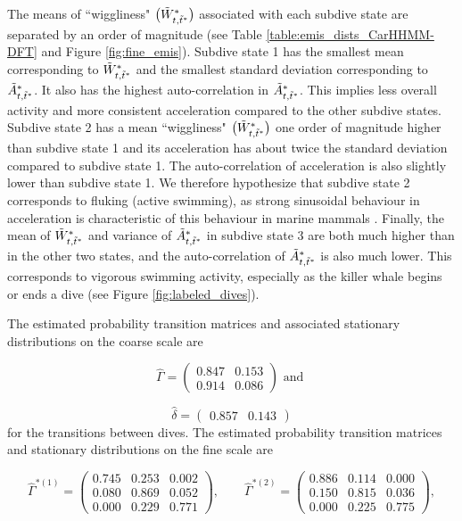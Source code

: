 The means of ``wiggliness" $\big(\tilde{W}^*_{t,\tilde t^*}\big)$ associated with each subdive state are separated by an order of magnitude (see Table \ref{table:emis_dists_CarHHMM-DFT} and Figure \ref{fig:fine_emis}). 
Subdive state 1 has the smallest mean corresponding to $\tilde{W}^*_{t,\tilde t^*}$ and the smallest standard deviation corresponding to $\tilde{A}^*_{t,\tilde t^*}$. It also has the highest auto-correlation in $\tilde{A}^*_{t,\tilde t^*}$. This implies less overall activity and more consistent acceleration compared to the other subdive states. 
Subdive state 2 has a mean ``wiggliness" $\big(\tilde{W}^*_{t,\tilde t^*}\big)$ one order of magnitude higher than subdive state 1 and its acceleration has about twice the standard deviation compared to subdive state 1. The auto-correlation of acceleration is also slightly lower than subdive state 1. We therefore hypothesize that subdive state 2 corresponds to fluking (active swimming), as strong sinusoidal behaviour in acceleration is characteristic of this behaviour in marine mammals \citep{Simon:2012}.
Finally, the mean of $\tilde{W}^*_{t,\tilde t^*}$ and variance of $\tilde{A}^*_{t,\tilde t^*}$ in subdive state 3 are both much higher than in the other two states, and the auto-correlation of $\tilde{A}^*_{t,\tilde t^*}$ is also much lower. This corresponds to vigorous swimming activity, especially as the killer whale begins or ends a dive (see Figure \ref{fig:labeled_dives}). 

The estimated probability transition matrices and associated stationary distributions on the coarse scale are

\[\hat \Gamma = \begin{pmatrix} 
0.847 & 0.153 \\
0.914 & 0.086
\end{pmatrix} \text{ and }\]

\[\hat \delta = \begin{pmatrix} 0.857 & 0.143 \end{pmatrix}\]
%
for the transitions between dives. The estimated probability transition matrices and stationary distributions on the fine scale are 

\[\hat \Gamma^{*(1)} = \begin{pmatrix} 
0.745 & 0.253 & 0.002 \\
0.080 & 0.869 & 0.052 \\
0.000 & 0.229 & 0.771
\end{pmatrix}, \qquad 
\hat \Gamma^{*(2)} = \begin{pmatrix} 
0.886 & 0.114 & 0.000 \\
0.150 & 0.815 & 0.036 \\
0.000 & 0.225 & 0.775
\end{pmatrix},\]

